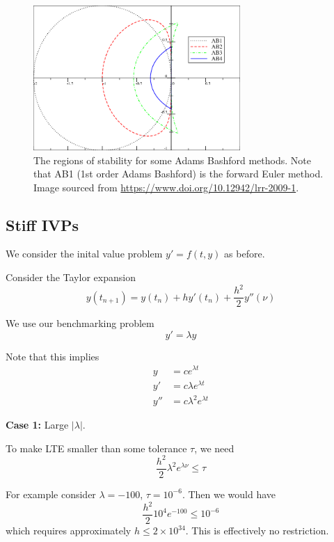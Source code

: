 \documentclass[12pt,letterpaper]{article}
\begin{document}
\begin{figure}[H]
	\centering
	\includegraphics[width=0.7\textwidth]{AB_stability.png}
	\caption{The regions of stability for some Adams Bashford methods. Note that AB1 (1st order Adams Bashford) is the forward Euler method. Image sourced from \url{https://www.doi.org/10.12942/lrr-2009-1}.}
\end{figure}

\subsection{Stiff IVPs}

We consider the inital value problem $y' = f(t,y)$ as before.

Consider the Taylor expansion
\begin{equation}
	y(t_{n+1}) = y(t_n) + hy'(t_n) + \frac{h^2}{2} y''(\nu)
\end{equation}

We use our benchmarking problem
\begin{equation}
	y' = \lambda y
\end{equation}

Note that this implies
\begin{align}
	y &= ce^{\lambda t} \\
	y' &= c\lambda e^{\lambda t} \\
	y'' &= c\lambda^2 e^{\lambda t}
\end{align}

\textbf{Case 1:} Large $\lvert \lambda \rvert$.

To make LTE smaller than some tolerance $\tau$, we need
\begin{equation}
	\frac{h^2}{2} \lambda^2 e^{\lambda \nu} \leq \tau
\end{equation}

For example consider $\lambda=-100$, $\tau = 10^{-6}$. Then we would have
\begin{equation}
	\frac{h^2}{2}10^4 e^{-100} \leq 10^{-6}
\end{equation}
which requires approximately $h \leq 2\times10^{34}$. This is effectively no restriction.
\end{document}
